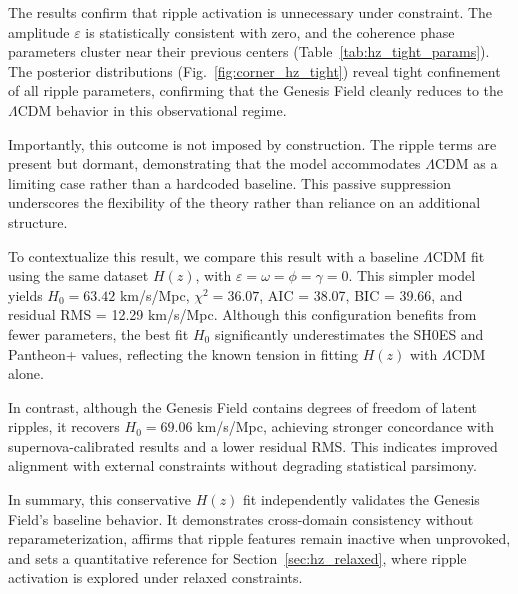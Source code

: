 The results confirm that ripple activation is unnecessary under constraint. The amplitude $\varepsilon$ is statistically consistent with zero, and the coherence phase parameters cluster near their previous centers (Table~\ref{tab:hz_tight_params}). The posterior distributions (Fig.~\ref{fig:corner_hz_tight}) reveal tight confinement of all ripple parameters, confirming that the Genesis Field cleanly reduces to the $\Lambda$CDM behavior in this observational regime.

Importantly, this outcome is not imposed by construction. The ripple terms are present but dormant, demonstrating that the model accommodates $\Lambda$CDM as a limiting case rather than a hardcoded baseline. This passive suppression underscores the flexibility of the theory rather than reliance on an additional structure.

To contextualize this result, we compare this result with a baseline $\Lambda$CDM fit using the same dataset $H(z)$, with $\varepsilon = \omega = \phi = \gamma = 0$. This simpler model yields $H_0 = 63.42$ km/s/Mpc, $\chi^2 = 36.07$, AIC = 38.07, BIC = 39.66, and residual RMS = 12.29 km/s/Mpc. Although this configuration benefits from fewer parameters, the best fit $H_0$ significantly underestimates the SH0ES and Pantheon+ values, reflecting the known tension in fitting $H(z)$ with $\Lambda$CDM alone.

In contrast, although the Genesis Field contains degrees of freedom of latent ripples, it recovers $H_0 = 69.06$ km/s/Mpc, achieving stronger concordance with supernova-calibrated results and a lower residual RMS. This indicates improved alignment with external constraints without degrading statistical parsimony.

In summary, this conservative $H(z)$ fit independently validates the Genesis Field’s baseline behavior. It demonstrates cross-domain consistency without reparameterization, affirms that ripple features remain inactive when unprovoked, and sets a quantitative reference for Section~\ref{sec:hz_relaxed}, where ripple activation is explored under relaxed constraints.

